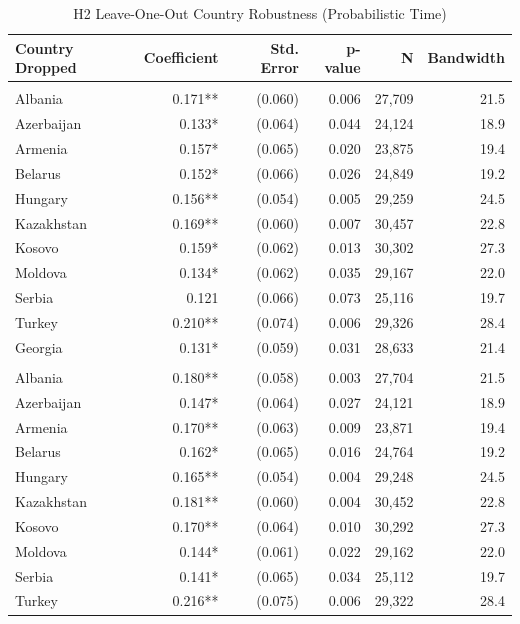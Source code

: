\begin{table}[t]
\caption{\label{tab:s6}H2 Leave-One-Out Country Robustness (Probabilistic Time)}
\fontsize{12.0pt}{14.0pt}\selectfont
\begin{tabular*}{\linewidth}{@{\extracolsep{\fill}}lrrrrr}
\toprule
Country Dropped & Coefficient & Std. Error & p-value & N & Bandwidth \\ 
\midrule\addlinespace[2.5pt]
\multicolumn{6}{l}{Standard Model} \\[2.5pt] 
\midrule\addlinespace[2.5pt]
Albania & 0.171** & (0.060) & 0.006 & 27,709 & 21.5 \\ 
Azerbaijan & 0.133* & (0.064) & 0.044 & 24,124 & 18.9 \\ 
Armenia & 0.157* & (0.065) & 0.020 & 23,875 & 19.4 \\ 
Belarus & 0.152* & (0.066) & 0.026 & 24,849 & 19.2 \\ 
Hungary & 0.156** & (0.054) & 0.005 & 29,259 & 24.5 \\ 
Kazakhstan & 0.169** & (0.060) & 0.007 & 30,457 & 22.8 \\ 
Kosovo & 0.159* & (0.062) & 0.013 & 30,302 & 27.3 \\ 
Moldova & 0.134* & (0.062) & 0.035 & 29,167 & 22.0 \\ 
Serbia & 0.121 & (0.066) & 0.073 & 25,116 & 19.7 \\ 
Turkey & 0.210** & (0.074) & 0.006 & 29,326 & 28.4 \\ 
Georgia & 0.131* & (0.059) & 0.031 & 28,633 & 21.4 \\ 
\midrule\addlinespace[2.5pt]
\multicolumn{6}{l}{Matched Model} \\[2.5pt] 
\midrule\addlinespace[2.5pt]
Albania & 0.180** & (0.058) & 0.003 & 27,704 & 21.5 \\ 
Azerbaijan & 0.147* & (0.064) & 0.027 & 24,121 & 18.9 \\ 
Armenia & 0.170** & (0.063) & 0.009 & 23,871 & 19.4 \\ 
Belarus & 0.162* & (0.065) & 0.016 & 24,764 & 19.2 \\ 
Hungary & 0.165** & (0.054) & 0.004 & 29,248 & 24.5 \\ 
Kazakhstan & 0.181** & (0.060) & 0.004 & 30,452 & 22.8 \\ 
Kosovo & 0.170** & (0.064) & 0.010 & 30,292 & 27.3 \\ 
Moldova & 0.144* & (0.061) & 0.022 & 29,162 & 22.0 \\ 
Serbia & 0.141* & (0.065) & 0.034 & 25,112 & 19.7 \\ 
Turkey & 0.216** & (0.075) & 0.006 & 29,322 & 28.4 \\ 

\end{tabular*}
\end{table}
